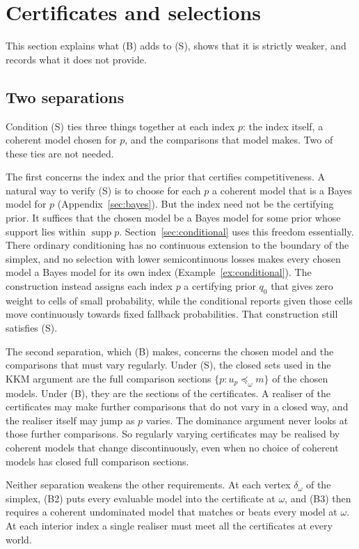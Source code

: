 \documentclass[11pt]{article}
\theoremstyle{definition}
\theoremstyle{remark}
\newcommand{\supp}{\operatorname{supp}}
\begin{document}
\section{Certificates and selections}\label{sec:compare}
This section explains what (B) adds to (S), shows that it is strictly weaker, and records what it does not provide.

\subsection{Two separations}\label{sec:separations}
Condition (S) ties three things together at each index $p$: the index itself, a coherent model chosen for $p$, and the comparisons that model makes. Two of these ties are not needed.

The first concerns the index and the prior that certifies competitiveness. A natural way to verify (S) is to choose for each $p$ a coherent model that is a Bayes model for $p$ (Appendix~\ref{sec:bayes}). But the index need not be the certifying prior. It suffices that the chosen model be a Bayes model for some prior whose support lies within $\supp p$. Section~\ref{sec:conditional} uses this freedom essentially. There ordinary conditioning has no continuous extension to the boundary of the simplex, and no selection with lower semicontinuous losses makes every chosen model a Bayes model for its own index (Example~\ref{ex:conditional}). The construction instead assigns each index $p$ a certifying prior $q_0$ that gives zero weight to cells of small probability, while the conditional reports given those cells move continuously towards fixed fallback probabilities. That construction still satisfies (S).

The second separation, which (B) makes, concerns the chosen model and the comparisons that must vary regularly. Under (S), the closed sets used in the KKM argument are the full comparison sections $\{p:u_p\preceq_\omega m\}$ of the chosen models. Under (B), they are the sections of the certificates. A realiser of the certificates may make further comparisons that do not vary in a closed way, and the realiser itself may jump as $p$ varies. The dominance argument never looks at those further comparisons. So regularly varying certificates may be realised by coherent models that change discontinuously, even when no choice of coherent models has closed full comparison sections.

Neither separation weakens the other requirements. At each vertex $\delta_\omega$ of the simplex, (B2) puts every evaluable model into the certificate at $\omega$, and (B3) then requires a coherent undominated model that matches or beats every model at $\omega$. At each interior index a single realiser must meet all the certificates at every world.
\end{document}
